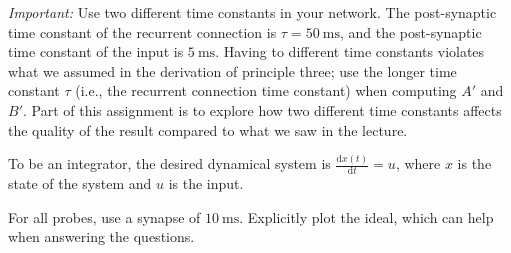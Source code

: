 	\emph{Important:} Use two different time constants in your network. The post-synaptic time constant of the recurrent connection is $\tau = \SI{50}{\milli\second}$, and the post-synaptic time constant of the input is $\SI{5}{\milli\second}$. Having to different time constants violates what we assumed in the derivation of principle three; use the longer time constant $\tau$ (i.e., the recurrent connection time constant) when computing $A'$ and $B'$. Part of this assignment is to explore how two different time constants affects the quality of the result compared to what we saw in the lecture.
	
	To be an integrator, the desired dynamical system is $\frac{\mathrm{d}x(t)}{\mathrm{d}t} = u$, where $x$ is the state of the system and $u$ is the input.
	
	For all probes, use a synapse of $\SI{10}{\milli\second}$. Explicitly plot the ideal, which can help when answering the questions.

